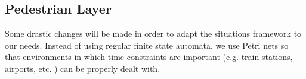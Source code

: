 \documentclass[11pt]{article}
\begin{document}
\subsection{Pedestrian Layer}
Some drastic changes will be made in order to adapt the situations framework to our needs. Instead of using regular finite state automata, we use Petri nets so that environments in which time constraints are important (e.g. train stations, airports, etc. ) can be properly dealt with.



\end{document}
